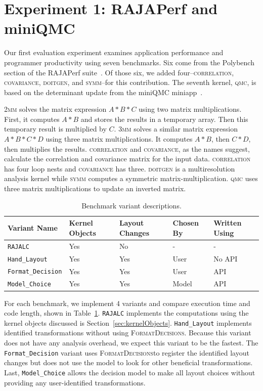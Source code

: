 \documentclass[sigconf,review=true]{acmart}
\newcommand{\FormatDecisions}[0]{{\textsc{FormatDecisions}}}
\begin{document}
\section{Experiment 1: RAJAPerf and miniQMC}
\label{sec:Experiment1}

Our first evaluation experiment examines application performance and programmer productivity using seven benchmarks.
Six come from the Polybench~\cite{pouchet2012polybench} section of the RAJAPerf suite~\cite{hornung2017raja}. 
Of those six, we added four--\textsc{correlation}, \textsc{covariance}, \textsc{doitgen}, and \textsc{symm}--for this contribution. 
The seventh kernel, \textsc{qmc}, is based on the determinant update from the miniQMC miniapp~\cite{richards2018fy18}.


\textsc{2mm} solves the matrix expression $A*B*C$ using two matrix multiplications. 
First, it computes $A*B$ and stores the results in a temporary array.
Then this temporary result is multiplied by $C$.
\textsc{3mm} solves a similar matrix expression $A*B*C*D$ using three matrix multiplications.
It computes $A*B$, then $C*D$, then multiplies the results.
\textsc{correlation} and \textsc{covariance}, as the names suggest, calculate the correlation and covariance matrix for the input data. 
\textsc{correlation} has four loop nests and \textsc{covariance} has three.
\textsc{doitgen} is a multiresolution analysis kernel while \textsc{symm} computes a symmetric matrix-multiplication.
\textsc{qmc} uses three matrix multiplications to update an inverted matrix. 

\begin{table}
	\centering
	\begin{tabular}{| p{2.4cm} | p{1.1cm} | p{1.1cm} | p{1cm} | p{1cm}|}
		\hline
		 \raggedright Variant \linebreak Name & \raggedright Kernel Objects & \raggedright Layout Changes & \raggedright Chosen By &  Written Using \tabularnewline
		\hline
		\verb.RAJALC. & Yes & No & - & - \\
		\verb.Hand_Layout. & Yes & Yes & User & No API \\
		\verb.Format_Decision. & Yes & Yes & User & API \\
		\verb.Model_Choice. & Yes & Yes & Model & API \\
		\hline
	\end{tabular}
	\caption{Benchmark variant descriptions.}
	\label{VariantDescription}
\end{table}
For each benchmark, we implement 4 variants and compare execution time and code length, shown in Table~\ref{VariantDescription}.
\verb.RAJALC. implements the computations using the kernel objects discussed is Section~\ref{sec:kernelObjects}. 
\verb.Hand_Layout. implements identified transformations without using \FormatDecisions. 
Because this variant does not have any analysis overhead, we expect this variant to be the fastest.
The \verb.Format_Decision. variant uses \FormatDecisions to register the identified layout changes but does not use the model to look for other beneficial transformations.
Last, \verb.Model_Choice. allows the decision model to make all layout choices without providing any user-identified transformations.
\end{document}
